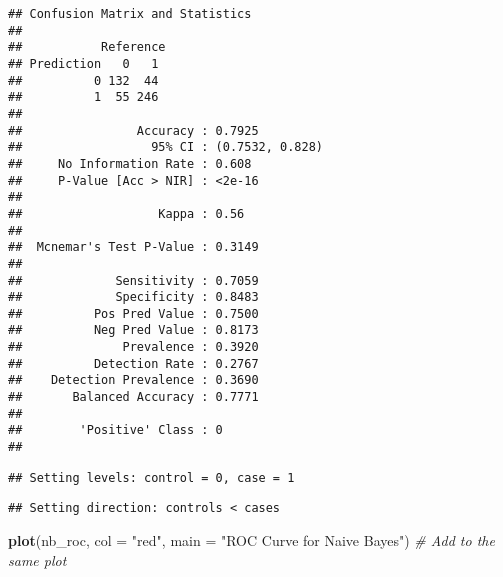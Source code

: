 \documentclass[
]{article}
\newenvironment{Shaded}{\begin{snugshade}}{\end{snugshade}}
\newcommand{\AttributeTok}[1]{\textcolor[rgb]{0.13,0.29,0.53}{#1}}
\newcommand{\CommentTok}[1]{\textcolor[rgb]{0.56,0.35,0.01}{\textit{#1}}}
\newcommand{\DecValTok}[1]{\textcolor[rgb]{0.00,0.00,0.81}{#1}}
\newcommand{\FloatTok}[1]{\textcolor[rgb]{0.00,0.00,0.81}{#1}}
\newcommand{\FunctionTok}[1]{\textcolor[rgb]{0.13,0.29,0.53}{\textbf{#1}}}
\newcommand{\NormalTok}[1]{#1}
\newcommand{\OtherTok}[1]{\textcolor[rgb]{0.56,0.35,0.01}{#1}}
\newcommand{\SpecialCharTok}[1]{\textcolor[rgb]{0.81,0.36,0.00}{\textbf{#1}}}
\newcommand{\StringTok}[1]{\textcolor[rgb]{0.31,0.60,0.02}{#1}}
\begin{document}
\begin{verbatim}
## Confusion Matrix and Statistics
## 
##           Reference
## Prediction   0   1
##          0 132  44
##          1  55 246
##                                          
##                Accuracy : 0.7925         
##                  95% CI : (0.7532, 0.828)
##     No Information Rate : 0.608          
##     P-Value [Acc > NIR] : <2e-16         
##                                          
##                   Kappa : 0.56           
##                                          
##  Mcnemar's Test P-Value : 0.3149         
##                                          
##             Sensitivity : 0.7059         
##             Specificity : 0.8483         
##          Pos Pred Value : 0.7500         
##          Neg Pred Value : 0.8173         
##              Prevalence : 0.3920         
##          Detection Rate : 0.2767         
##    Detection Prevalence : 0.3690         
##       Balanced Accuracy : 0.7771         
##                                          
##        'Positive' Class : 0              
## 
\end{verbatim}

\begin{Shaded}
\end{Shaded}

\begin{verbatim}
## Setting levels: control = 0, case = 1
\end{verbatim}

\begin{verbatim}
## Setting direction: controls < cases
\end{verbatim}

\begin{Shaded}
\begin{Highlighting}[]
\FunctionTok{plot}\NormalTok{(nb\_roc, }\AttributeTok{col =} \StringTok{"red"}\NormalTok{, }\AttributeTok{main =} \StringTok{"ROC Curve for Naive Bayes"}\NormalTok{)  }\CommentTok{\# Add to the same plot}
\end{Highlighting}
\end{Shaded}
\end{document}
